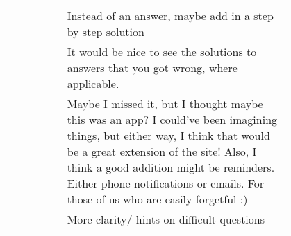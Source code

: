 {\begin{longtable}{R|p{0.8\linewidth}}
		& Instead of an answer, maybe add in a step by step solution                                                                                                                                                                                                                                                                                                                                                                                                                                                                                                                                                                                                                                                                                       \\
		& It would be nice to see the solutions to answers that you got wrong, where applicable.                                                                                                                                                                                                                                                                                                                                                                                                                                                                                                                                                                                                                                                           \\
		& Maybe I missed it, but I thought maybe this was an app? I could've been imagining things, but either way, I think that would be a great extension of the site! Also, I think a good addition might be reminders. Either phone notifications or emails. For those of us who are easily forgetful :)                                                                                                                                                                                                                                                                                                                                                                                                                                               \\
		& More clarity/ hints on difficult questions                                                                                                                                                                                                                                                                                                                                                                                                                                                                                                                                                                                                                                                                                                       \\

\end{longtable}}
